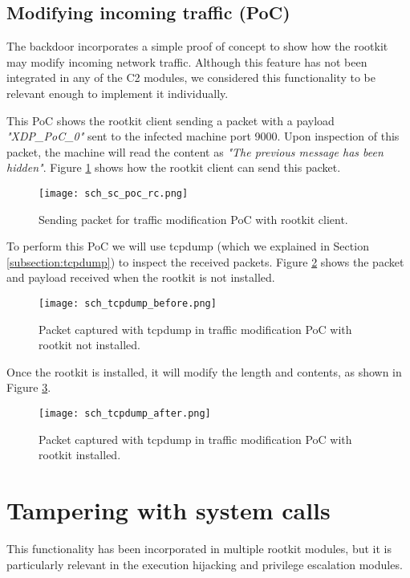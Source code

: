 \subsection{Modifying incoming traffic (PoC)} \label{subsection:poc_evaluation}
The backdoor incorporates a simple proof of concept to show how the rootkit may modify incoming network traffic. Although this feature has not been integrated in any of the C2 modules, we considered this functionality to be relevant enough to implement it individually.

This PoC shows the rootkit client sending a packet with a payload \textit{"XDP\_PoC\_0"} sent to the infected machine port 9000. Upon inspection of this packet, the machine will read the content as \textit{"The previous message has been hidden"}. Figure \ref{fig:sc_poc_rc} shows how the rootkit client can send this packet.

\begin{figure}[htbp]
	\centering
	\texttt{[image: sch\_sc\_poc\_rc.png]}
	\caption{Sending packet for traffic modification PoC with rootkit client.}
	\label{fig:sc_poc_rc}
\end{figure}

To perform this PoC we will use tcpdump (which we explained in Section \ref{subsection:tcpdump}) to inspect the received packets. Figure \ref{fig:sc_tcpdump_before} shows the packet and payload received when the rootkit is not installed.

\begin{figure}[htbp]
	\centering
	\texttt{[image: sch\_tcpdump\_before.png]}
	\caption{Packet captured with tcpdump in traffic modification PoC with rootkit not installed.}
	\label{fig:sc_tcpdump_before}
\end{figure}

Once the rootkit is installed, it will modify the length and contents, as shown in Figure \ref{fig:sc_tcpdump_after}.

\begin{figure}[htbp]
	\centering
	\texttt{[image: sch\_tcpdump\_after.png]}
	\caption{Packet captured with tcpdump in traffic modification PoC with rootkit installed.}
	\label{fig:sc_tcpdump_after}
\end{figure}


\section{Tampering with system calls}
This functionality has been incorporated in multiple rootkit modules, but it is particularly relevant in the execution hijacking and privilege escalation modules.

